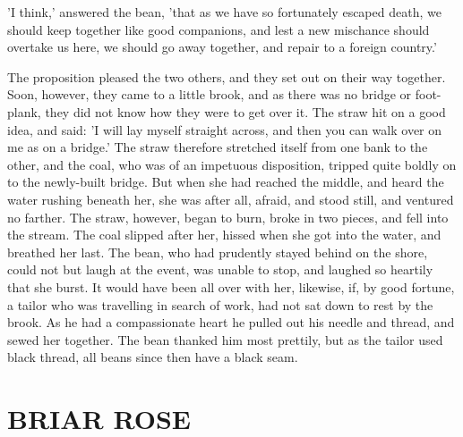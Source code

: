 \documentclass[12pt]{book}
\begin{document}
'I think,' answered the bean, 'that as we have so fortunately escaped
death, we should keep together like good companions, and lest a new
mischance should overtake us here, we should go away together, and
repair to a foreign country.'

The proposition pleased the two others, and they set out on their way
together. Soon, however, they came to a little brook, and as there was
no bridge or foot-plank, they did not know how they were to get over
it. The straw hit on a good idea, and said: 'I will lay myself
straight across, and then you can walk over on me as on a bridge.' The
straw therefore stretched itself from one bank to the other, and the
coal, who was of an impetuous disposition, tripped quite boldly on to
the newly-built bridge. But when she had reached the middle, and heard
the water rushing beneath her, she was after all, afraid, and stood
still, and ventured no farther. The straw, however, began to burn,
broke in two pieces, and fell into the stream. The coal slipped after
her, hissed when she got into the water, and breathed her last. The
bean, who had prudently stayed behind on the shore, could not but
laugh at the event, was unable to stop, and laughed so heartily that
she burst. It would have been all over with her, likewise, if, by good
fortune, a tailor who was travelling in search of work, had not sat
down to rest by the brook. As he had a compassionate heart he pulled
out his needle and thread, and sewed her together. The bean thanked
him most prettily, but as the tailor used black thread, all beans
since then have a black seam.



\chapter{BRIAR ROSE}
\end{document}

